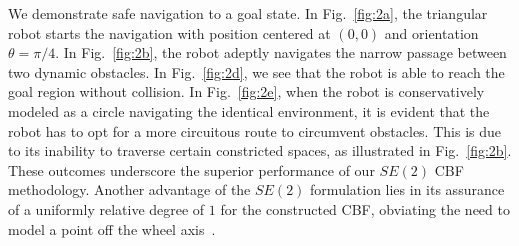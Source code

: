 We demonstrate safe navigation to a goal state. In Fig.~\ref{fig:2a}, the triangular robot starts the navigation with position centered at $(0,0)$ and orientation $\theta = \pi / 4$. In Fig.~\ref{fig:2b}, the robot adeptly navigates the narrow passage between two dynamic obstacles. In Fig.~\ref{fig:2d}, we see that the robot is able to reach the goal region without collision. In Fig.~\ref{fig:2e}, when the robot is conservatively modeled as a circle navigating the identical environment, it is evident that the robot has to opt for a more circuitous route to circumvent obstacles. This is due to its inability to traverse certain constricted spaces, as illustrated in Fig.~\ref{fig:2b}. These outcomes underscore the superior performance of our $SE(2)$ CBF methodology. Another advantage of the $SE(2)$ formulation lies in its assurance of a uniformly relative degree of $1$ for the constructed CBF, obviating the need to model a point off the wheel axis~\cite{cortes2017coordinated}.


